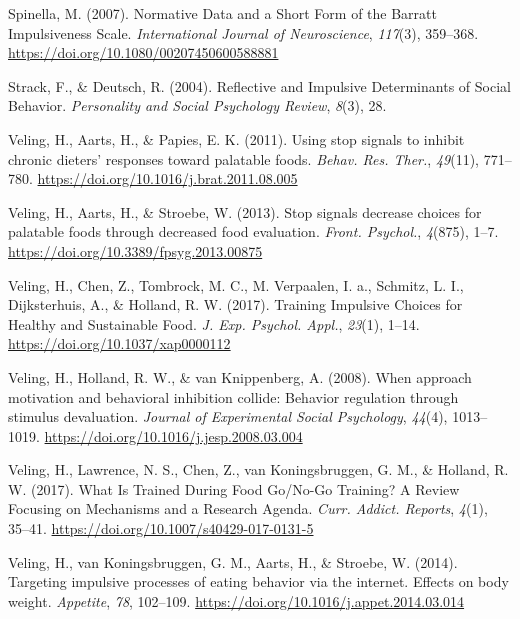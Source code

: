 \documentclass[man,floatsintext]{apa6}
\begin{document}
\leavevmode\hypertarget{ref-spinellaNormativeDataShort2007}{}%
Spinella, M. (2007). Normative Data and a Short Form of the Barratt Impulsiveness Scale. \emph{International Journal of Neuroscience}, \emph{117}(3), 359--368. \url{https://doi.org/10.1080/00207450600588881}

\leavevmode\hypertarget{ref-strack_reflective_2004}{}%
Strack, F., \& Deutsch, R. (2004). Reflective and Impulsive Determinants of Social Behavior. \emph{Personality and Social Psychology Review}, \emph{8}(3), 28.

\leavevmode\hypertarget{ref-veling_using_2011}{}%
Veling, H., Aarts, H., \& Papies, E. K. (2011). Using stop signals to inhibit chronic dieters' responses toward palatable foods. \emph{Behav. Res. Ther.}, \emph{49}(11), 771--780. \url{https://doi.org/10.1016/j.brat.2011.08.005}

\leavevmode\hypertarget{ref-veling_stop_2013}{}%
Veling, H., Aarts, H., \& Stroebe, W. (2013). Stop signals decrease choices for palatable foods through decreased food evaluation. \emph{Front. Psychol.}, \emph{4}(875), 1--7. \url{https://doi.org/10.3389/fpsyg.2013.00875}

\leavevmode\hypertarget{ref-veling_training_2017-1}{}%
Veling, H., Chen, Z., Tombrock, M. C., M. Verpaalen, I. a., Schmitz, L. I., Dijksterhuis, A., \& Holland, R. W. (2017). Training Impulsive Choices for Healthy and Sustainable Food. \emph{J. Exp. Psychol. Appl.}, \emph{23}(1), 1--14. \url{https://doi.org/10.1037/xap0000112}

\leavevmode\hypertarget{ref-veling_when_2008}{}%
Veling, H., Holland, R. W., \& van Knippenberg, A. (2008). When approach motivation and behavioral inhibition collide: Behavior regulation through stimulus devaluation. \emph{Journal of Experimental Social Psychology}, \emph{44}(4), 1013--1019. \url{https://doi.org/10.1016/j.jesp.2008.03.004}

\leavevmode\hypertarget{ref-veling_what_2017}{}%
Veling, H., Lawrence, N. S., Chen, Z., van Koningsbruggen, G. M., \& Holland, R. W. (2017). What Is Trained During Food Go/No-Go Training? A Review Focusing on Mechanisms and a Research Agenda. \emph{Curr. Addict. Reports}, \emph{4}(1), 35--41. \url{https://doi.org/10.1007/s40429-017-0131-5}

\leavevmode\hypertarget{ref-veling_targeting_2014}{}%
Veling, H., van Koningsbruggen, G. M., Aarts, H., \& Stroebe, W. (2014). Targeting impulsive processes of eating behavior via the internet. Effects on body weight. \emph{Appetite}, \emph{78}, 102--109. \url{https://doi.org/10.1016/j.appet.2014.03.014}
\end{document}

